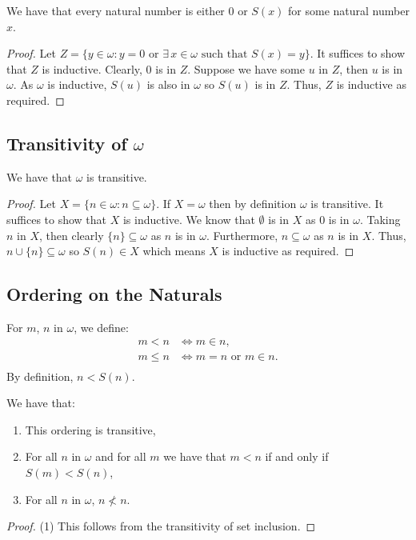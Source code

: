 We have that every natural number is either $0$ or $S(x)$ for some
natural number $x$.

\begin{proof}
    Let $Z = \{y \in \omega : y = 0 \text{ or } 
    \exists \, x \in \omega \text{ such that } S(x) = y\}$. It 
    suffices to show that $Z$ is inductive. Clearly, $0$ is in $Z$.
    Suppose we have some $u$ in $Z$, then $u$ is in $\omega$.
    As $\omega$ is inductive, $S(u)$ is also in $\omega$ so
    $S(u)$ is in $Z$. Thus, $Z$ is inductive as required.
\end{proof}

\subsection{Transitivity of $\omega$}

We have that $\omega$ is transitive.

\begin{proof}
    Let $X = \{n \in \omega : n \subseteq \omega\}$. If $X = \omega$
    then by definition $\omega$ is transitive. It suffices to show that
    $X$ is inductive. We know that $\emptyset$ is in $X$ as $0$ is in
    $\omega$. Taking $n$ in $X$, then clearly $\{n\} \subseteq \omega$
    as $n$ is in $\omega$. Furthermore, $n \subseteq \omega$ as $n$
    is in $X$. Thus, $n \cup \{n\} \subseteq \omega$ so $S(n) \in X$
    which means $X$ is inductive as required.
\end{proof}

\subsection{Ordering on the Naturals}

For $m$, $n$ in $\omega$, we define: \begin{align*}
    m < n &\Longleftrightarrow m \in n, \\
    m \leq n &\Longleftrightarrow m = n \text{ or } m \in n. \\
\end{align*} By definition, $n < S(n)$.

\newpage
\noindent
We have that: \begin{enumerate}
    \item This ordering is transitive,
    \item For all $n$ in $\omega$ and for all $m$ we have that
        $m < n$ if and only if $S(m) < S(n)$,
    \item For all $n$ in $\omega$, $n \nless n$.
\end{enumerate}

\begin{proof}
    (1) This follows from the transitivity of set inclusion.
\end{proof}